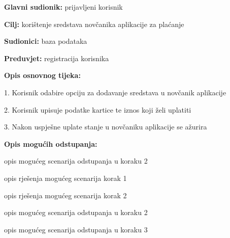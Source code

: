 					\noindent {}
					\begin{packed_item}
						
						\item \textbf{Glavni sudionik: }prijavljeni korisnik
						\item  \textbf{Cilj:} korištenje sredstava novčanika aplikacije za plaćanje
						\item  \textbf{Sudionici:} baza podataka
						\item  \textbf{Preduvjet:} registracija korisnika
						\item  \textbf{Opis osnovnog tijeka:}
						
						\item[] \begin{packed_enum}
							
							\item 1. Korisnik odabire opciju za dodavanje sredstava u novčanik aplikacije
							\item 2. Korisnik upisuje podatke kartice te iznos koji želi uplatiti
							\item 3. Nakon uspješne uplate stanje u novčaniku aplikacije se ažurira
						\end{packed_enum}
						
						\item  \textbf{Opis mogućih odstupanja:}
						
						\item[] \begin{packed_item}
							
							\item[2.a] opis mogućeg scenarija odstupanja u koraku 2
							\item[] \begin{packed_enum}
								
								\item opis rješenja mogućeg scenarija korak 1
								\item opis rješenja mogućeg scenarija korak 2
								
							\end{packed_enum}
							\item[2.b] opis mogućeg scenarija odstupanja u koraku 2
							\item[3.a] opis mogućeg scenarija odstupanja  u koraku 3
							
						\end{packed_item}
					\end{packed_item}
					
